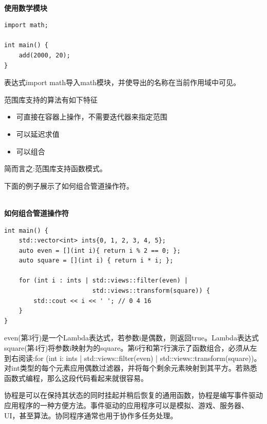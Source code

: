 \hspace*{\fill} \\ %
\noindent
\textbf{使用数学模块}
\begin{lstlisting}[style=styleCXX]
import math;

int main() {
	add(2000, 20);
}
\end{lstlisting}

表达式import math导入math模块，并使导出的名称在当前作用域中可见。


范围库支持的算法有如下特征

\begin{itemize}
\item 
可直接在容器上操作，不需要迭代器来指定范围

\item 
可以延迟求值

\item 
可以组合
\end{itemize}

简而言之:范围库支持函数模式。

下面的例子展示了如何组合管道操作符。

\hspace*{\fill} \\ %
\noindent
\textbf{如何组合管道操作符}
\begin{lstlisting}[style=styleCXX]
int main() {
	std::vector<int> ints{0, 1, 2, 3, 4, 5};
	auto even = [](int i){ return i % 2 == 0; };
	auto square = [](int i) { return i * i; };
	
	for (int i : ints | std::views::filter(even) |
						std::views::transform(square)) {
		std::cout << i << ' '; // 0 4 16
	}
}
\end{lstlisting}

even(第3行)是一个Lambda表达式，若参数i是偶数，则返回true。Lambda表达式square(第4行)将参数i映射为的square。第6行和第7行演示了函数组合，必须从左到右阅读:for (int i: ints | std::views::filter(even) | std::views::transform(square))。对int类型的每个元素应用偶数过滤器，并将每个剩余元素映射到其平方。若熟悉函数式编程，那么这段代码看起来就很容易。


协程是可以在保持其状态的同时挂起并稍后恢复的通用函数，协程是编写事件驱动应用程序的一种方便方法。事件驱动的应用程序可以是模拟、游戏、服务器、UI，甚至算法。协同程序通常也用于协作多任务处理。

